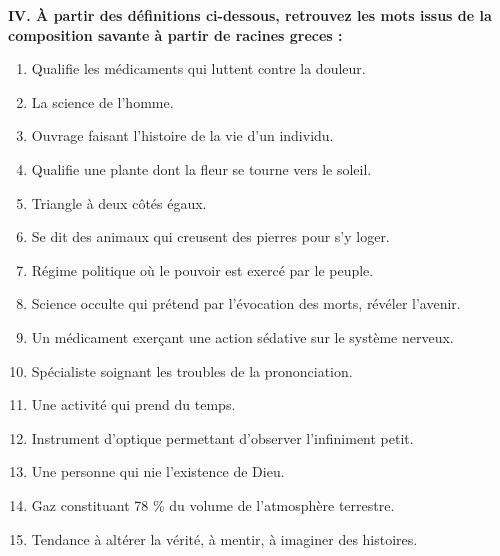 \textbf{IV. À partir des définitions ci-dessous, retrouvez les mots issus de la composition savante à partir de racines greces :}
\begin{keybox}
\begin{enumerate}[label=\arabic*.,leftmargin=1.7em,itemsep=.3ex]
\item Qualifie les médicaments qui luttent contre la douleur.
\item La science de l’homme.
\item Ouvrage faisant l’histoire de la vie d’un individu.
\item Qualifie une plante dont la fleur se tourne vers le soleil.
\item Triangle à deux côtés égaux.
\item Se dit des animaux qui creusent des pierres pour s’y loger.
\item Régime politique où le pouvoir est exercé par le peuple.
\item Science occulte qui prétend par l’évocation des morts, révéler l’avenir.
\item Un médicament exerçant une action sédative sur le système nerveux.
\item Spécialiste soignant les troubles de la prononciation.
\item Une activité qui prend du temps.
\item Instrument d’optique permettant d’observer l’infiniment petit.
\item Une personne qui nie l’existence de Dieu.
\item Gaz constituant 78 \% du volume de l’atmosphère terrestre.
\item Tendance à altérer la vérité, à mentir, à imaginer des histoires.
\end{enumerate}
\end{keybox}

